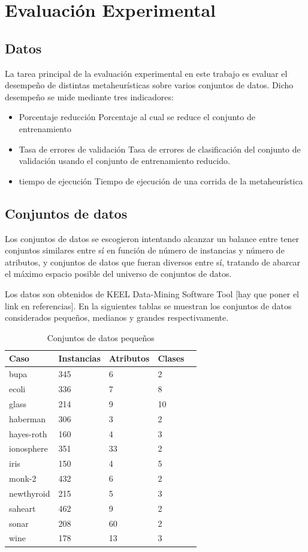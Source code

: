 \documentclass[11pt]{article}
\begin{document}
\section{Evaluación Experimental}

\subsection{Datos}

La tarea principal de la evaluación experimental en este trabajo es evaluar el desempeño de distintas metaheurísticas sobre varios conjuntos de datos. Dicho desempeño se mide mediante tres indicadores: 
\begin{itemize}
\item Porcentaje reducción 
    Porcentaje al cual se reduce el conjunto de entrenamiento
\item Tasa de errores de validación
    Tasa de errores de clasificación del conjunto de validación usando el conjunto de entrenamiento reducido.
\item tiempo de ejecución
    Tiempo de ejecución de una corrida de la metaheurística
\end{itemize}


\subsection{Conjuntos de datos}
Los conjuntos de datos se escogieron intentando alcanzar un balance entre tener conjuntos similares entre sí en función de número de instancias y número de atributos, y conjuntos de datos que fueran diversos entre sí, tratando de abarcar el máximo espacio posible del universo de conjuntos de datos.

Los datos son obtenidos de KEEL 
Data-Mining Software Tool [hay que poner el link en referencias].
En la siguientes tablas se muestran los conjuntos de datos considerados pequeños, medianos y grandes respectivamente.

\begin{table}[h]
\begin{tabular}{ |l|l|l|l|l| }
    \hline
    Caso    & Instancias & Atributos & Clases \\ \hline
    bupa & 345  & 6 &  2 \\ \hline
    ecoli & 336 & 7 & 8 \\ \hline
    glass & 214 & 9 & 10 \\ \hline
    haberman & 306 & 3 & 2 \\ \hline
    hayes-roth & 160 & 4 & 3 \\ \hline
    ionosphere & 351 & 33 & 2 \\ \hline
    iris & 150 & 4 & 5 \\ \hline
    monk-2 & 432 & 6 & 2 \\ \hline
    newthyroid & 215  & 5 & 3 \\ \hline
    saheart & 462 & 9 & 2 \\ \hline
    sonar & 208 & 60 & 2 \\ \hline
    wine & 178 & 13 & 3 \\ \hline
\end{tabular}
\caption{Conjuntos de datos pequeños}
\label{tabla:1}
\end{table}
\end{document}
